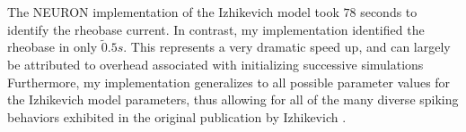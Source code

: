 


        
The NEURON implementation of the Izhikevich model took $78$ seconds to identify the rheobase current.
In contrast, my implementation identified the rheobase in only $\tilde 0.5 s$.
This represents a very dramatic speed up, and can largely be attributed to overhead associated with initializing successive simulations
Furthermore, my implementation generalizes to all possible parameter values for the Izhikevich model parameters, thus allowing for all of the many diverse spiking behaviors exhibited in the original publication by Izhikevich \cite{izhikevich2003simple}.

        

